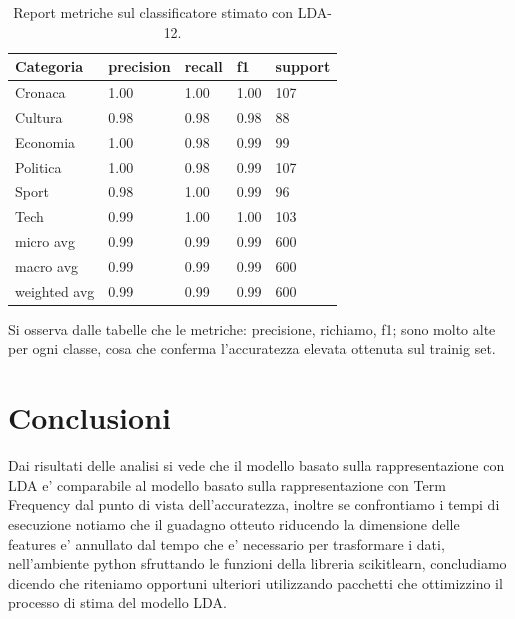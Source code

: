 \documentclass[runningheads]{llncs}
\begin{document}
\begin{table}[]
\centering
\begin{tabular}{lllll}
\hline
Categoria    & precision & recall & f1   & support \\ \hline
Cronaca      & 1.00   &   1.00    &  1.00  & 107      \\
Cultura      & 0.98      & 0.98   & 0.98 & 88      \\
Economia     & 1.00      & 0.98   & 0.99 & 99      \\
Politica     & 1.00      & 0.98   & 0.99 & 107      \\
Sport        & 0.98      & 1.00   & 0.99 & 96      \\
Tech         & 0.99      & 1.00   & 1.00 & 103      \\ \hline
micro avg    & 0.99      & 0.99   & 0.99 & 600     \\ \hline
macro avg    & 0.99      & 0.99   & 0.99 & 600     \\ \hline
weighted avg & 0.99      & 0.99   & 0.99 & 600    \\  \hline
\end{tabular}
    \caption{Report metriche sul classificatore stimato con LDA-12.}%

\end{table}

 

Si osserva dalle tabelle che le metriche: precisione, richiamo, f1; sono molto alte per ogni classe, cosa che conferma l'accuratezza elevata ottenuta sul trainig set.


\section{Conclusioni}

Dai risultati delle analisi si vede che il modello basato sulla rappresentazione con LDA e' comparabile al modello basato sulla rappresentazione con Term Frequency dal punto di vista dell'accuratezza, inoltre se confrontiamo i tempi di esecuzione notiamo che il guadagno otteuto riducendo la dimensione delle features e' annullato dal tempo che e' necessario per trasformare i dati, nell'ambiente python sfruttando le funzioni della libreria scikitlearn, concludiamo dicendo che  riteniamo opportuni ulteriori utilizzando pacchetti che ottimizzino il processo di stima del modello LDA.

\end{document}
